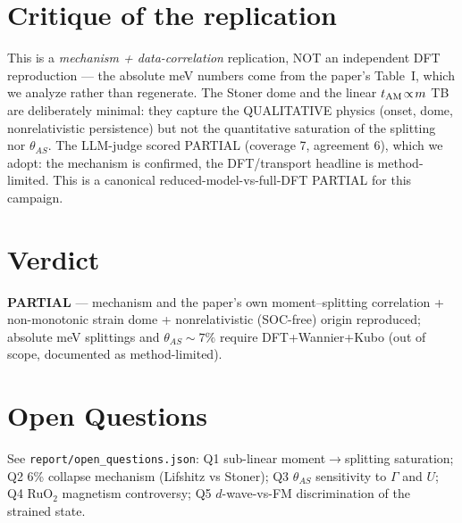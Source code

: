\documentclass[11pt]{article}
\begin{document}
\section{Critique of the replication}
This is a \emph{mechanism + data-correlation} replication, NOT an independent DFT reproduction ---
the absolute meV numbers come from the paper's Table~I, which we analyze rather than regenerate.
The Stoner dome and the linear $t_{\rm AM}\!\propto\!m$ TB are deliberately minimal: they capture the
QUALITATIVE physics (onset, dome, nonrelativistic persistence) but not the quantitative saturation
of the splitting nor $\theta_{AS}$. The LLM-judge scored PARTIAL (coverage 7, agreement 6),
which we adopt: the mechanism is confirmed, the DFT/transport headline is method-limited.
This is a canonical reduced-model-vs-full-DFT PARTIAL for this campaign.

\section{Verdict}
\textbf{PARTIAL} --- mechanism and the paper's own moment--splitting correlation + non-monotonic
strain dome + nonrelativistic (SOC-free) origin reproduced; absolute meV splittings and
$\theta_{AS}\!\sim\!7\%$ require DFT+Wannier+Kubo (out of scope, documented as method-limited).

\section*{Open Questions}
See \texttt{report/open\_questions.json}: Q1 sub-linear moment$\to$splitting saturation; Q2 6\%
collapse mechanism (Lifshitz vs Stoner); Q3 $\theta_{AS}$ sensitivity to $\Gamma$ and $U$; Q4 RuO$_2$
magnetism controversy; Q5 $d$-wave-vs-FM discrimination of the strained state.
\end{document}
